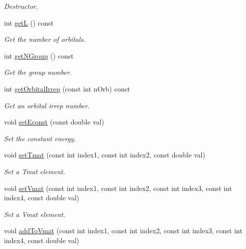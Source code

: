 \begin{DoxyCompactItemize}
\begin{DoxyCompactList}\small\item\em Destructor. \end{DoxyCompactList}\item 
int \hyperlink{classCheMPS2_1_1Hamiltonian_a101963cfa8f06abe798a7ae79faab618}{get\-L} () const 
\begin{DoxyCompactList}\small\item\em Get the number of orbitals. \end{DoxyCompactList}\item 
int \hyperlink{classCheMPS2_1_1Hamiltonian_a8c18f51ded63810e316f1834853dce21}{get\-N\-Group} () const 
\begin{DoxyCompactList}\small\item\em Get the group number. \end{DoxyCompactList}\item 
int \hyperlink{classCheMPS2_1_1Hamiltonian_a02130b2901a5a3c05171d4f7dd5fa4cd}{get\-Orbital\-Irrep} (const int n\-Orb) const 
\begin{DoxyCompactList}\small\item\em Get an orbital irrep number. \end{DoxyCompactList}\item 
void \hyperlink{classCheMPS2_1_1Hamiltonian_af6664242601063dd762c6a430054e4c5}{set\-Econst} (const double val)
\begin{DoxyCompactList}\small\item\em Set the constant energy. \end{DoxyCompactList}\item 
void \hyperlink{classCheMPS2_1_1Hamiltonian_a7a56bcf4365125ec144c21d5a4684c32}{set\-Tmat} (const int index1, const int index2, const double val)
\begin{DoxyCompactList}\small\item\em Set a Tmat element. \end{DoxyCompactList}\item 
void \hyperlink{classCheMPS2_1_1Hamiltonian_a2ddb391c8a20c50bdd2c775cffd8fbb1}{set\-Vmat} (const int index1, const int index2, const int index3, const int index4, const double val)
\begin{DoxyCompactList}\small\item\em Set a Vmat element. \end{DoxyCompactList}\item 
void \hyperlink{classCheMPS2_1_1Hamiltonian_ab6147d890404000374bb96baba0b1f82}{add\-To\-Vmat} (const int index1, const int index2, const int index3, const int index4, const double val)

\end{DoxyCompactItemize}
